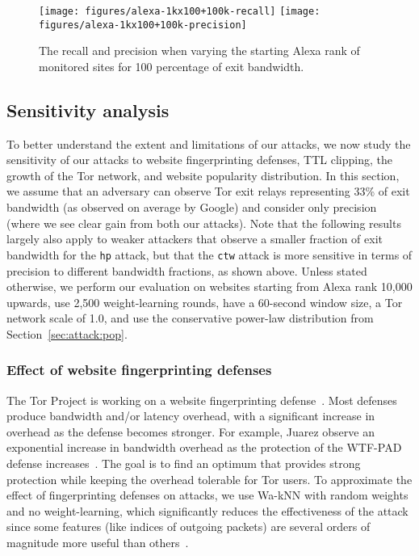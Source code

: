 \begin{figure}[t]
\centering
\texttt{[image: figures/alexa-1kx100+100k-recall]}
\texttt{[image: figures/alexa-1kx100+100k-precision]}
\caption{The recall and precision when varying the starting Alexa rank of
monitored sites for 100 percentage of exit bandwidth.}
\label{fig:fpt:alexa}
\end{figure}

\subsection{Sensitivity analysis}

To better understand the extent and limitations of our attacks, we
now study the sensitivity of our \name attacks to website fingerprinting defenses,
TTL clipping, the growth of the Tor network, and website popularity
distribution.  In this section, we assume that an adversary can observe Tor
exit relays representing 33\% of exit bandwidth (as observed on average
by Google) and consider only precision (where we see clear gain from both our
attacks).  Note that the following results largely also apply to weaker
attackers that observe a smaller fraction of exit bandwidth for the \texttt{hp}
attack, but that the \texttt{ctw} attack is more sensitive in terms of precision
to different bandwidth fractions, as shown above.
Unless stated otherwise, we \first perform our evaluation on websites starting
from Alexa rank 10,000 upwards, \second use
2,500 weight-learning rounds, \third have a 60-second window size, \fourth a Tor
network scale of 1.0, and \fifth use the conservative power-law distribution
from Section~\ref{sec:attack:pop}.



\subsubsection{Effect of website fingerprinting defenses}

The Tor Project is working on a website fingerprinting
defense~\cite{adapativepadding}.
Most defenses produce bandwidth and/or latency overhead, with a significant
increase in overhead as the defense becomes stronger.
For example, Juarez \ea
observe an exponential increase in bandwidth overhead as the protection of the
WTF-PAD defense increases~\cite[\S~4.3]{Juarez2016a}.
The goal is to find an optimum that provides strong protection
while keeping the overhead tolerable for Tor users.
To approximate the effect of fingerprinting
defenses on \name attacks, we use Wa-kNN with
random weights and no weight-learning, which significantly reduces the
effectiveness of the attack since some features (like indices of outgoing
packets) are several orders of magnitude more useful
than others~\cite{Juarez2016a}.

